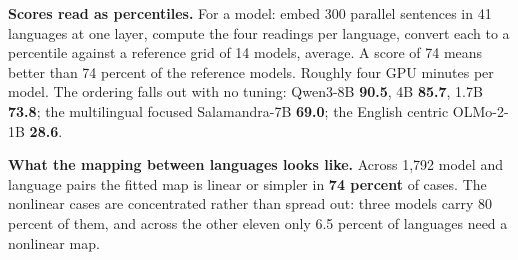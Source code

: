 \documentclass[11pt]{article}
\begin{document}
\textbf{Scores read as percentiles.} For a model: embed 300 parallel
sentences in 41 languages at one layer, compute the four readings per
language, convert each to a percentile against a reference grid of 14
models, average. A score of 74 means better than 74 percent of the
reference models. Roughly four GPU minutes per model. The ordering
falls out with no tuning: Qwen3-8B \textbf{90.5}, 4B \textbf{85.7},
1.7B \textbf{73.8}; the multilingual focused Salamandra-7B
\textbf{69.0}; the English centric OLMo-2-1B \textbf{28.6}.

\textbf{What the mapping between languages looks like.} Across 1{,}792
model and language pairs the fitted map is linear or simpler in
\textbf{74 percent} of cases. The nonlinear cases are concentrated
rather than spread out: three models carry 80 percent of them, and
across the other eleven only 6.5 percent of languages need a nonlinear
map.
\end{document}
